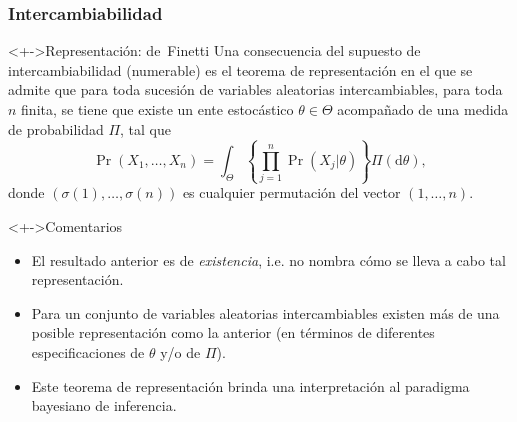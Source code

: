 \documentclass[cjk,t,compress]{beamer}
\newcommand{\dd}{\mathrm{d}}
\begin{document}
	\frame
	{
    \frametitle{Intercambiabilidad}
  		{\scriptsize  	
		
		\begin{block}<+->{Representaci\'on: de~Finetti}
	  	{
	  	Una consecuencia del supuesto de intercambiabilidad (numerable) es el teorema de representaci\'on en el que se admite que para toda sucesi\'on de variables aleatorias
intercambiables, para toda $n$ finita, se tiene que existe  un ente estoc\'astico $\theta \in \Theta$
acompa\~nado de una medida de probabilidad $\Pi$, tal que
	  	\begin{equation}
	  		\Pr(X_1,\ldots,X_n)=\int_{\Theta} \left\{ \prod_{j=1}^{n} \Pr(X_j|\theta) \right\} \Pi(\dd \theta),
	  	\end{equation}
	  	donde $(\sigma(1),\ldots,\sigma(n))$ es cualquier permutaci\'on del vector $(1,\ldots,n)$.
	  	}
 		\end{block}  		

	  	\vspace{0.3cm}
		\begin{block}<+->{Comentarios}
	  	{
	  	\begin{itemize}
	  		\item El resultado anterior es de {\em existencia}, i.e. no nombra c\'omo se lleva a cabo tal representaci\'on.
	  		\item Para un conjunto de variables aleatorias intercambiables existen m\'as de una posible representaci\'on como la anterior (en t\'erminos de diferentes
especificaciones de $\theta$ y/o de $\Pi$).
			\item Este teorema de representaci\'on brinda una interpretaci\'on al paradigma bayesiano de inferencia.
	  	\end{itemize}
	  	}
 		\end{block}  		

		}
	}

\end{document}

